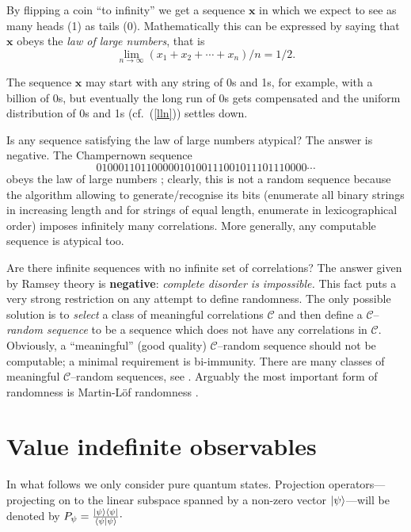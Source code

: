 \documentclass[%
 preprint,
 showpacs,
 showkeys,
 preprintnumbers,
  amsmath,amssymb,
  aps,
 pra,
  longbibliography,
  floatfix,
 ]{revtex4-1}
\theoremstyle{plain}
\newcommand{\x}{\mathbf{x}}
\newcommand{\ar}{\rightarrow}
\newcommand{\iprod}[2]{\langle #1 | #2 \rangle}
\newcommand{\oprod}[2]{| #1 \rangle\langle #2 |}
\begin{document}
\medskip


By flipping  a coin  ``to infinity'' we get a sequence $\x$ in which we expect to see as many heads (1) as tails (0). Mathematically this can be expressed by saying that
 $\x$ obeys the {\em law of large numbers}, that is
\begin{equation}
\label{lln}
\lim_{n\ar \infty}(x_{1}+ x_{2}+ \cdots +x_{n})/n=1/2.
\end{equation}

The sequence $\x$ may start with any string of 0s and 1s, for example, with a billion of 0s, but eventually the  long run of 0s gets compensated and the uniform distribution of 0s and 1s (cf.\ (\ref{lln})) settles down.

 Is any sequence satisfying the law of large numbers atypical? The answer is negative.
The Champernown sequence $$01000110110000010100111001011101110000\cdots$$ obeys the law of large numbers \cite{chm1933}; clearly, this is not a random sequence because the algorithm allowing to generate/recognise its bits (enumerate all binary strings in increasing length and for strings of equal length, enumerate in lexicographical order) imposes infinitely many correlations. More generally, any computable sequence is  atypical too.

\medskip

Are there infinite sequences with no infinite set of correlations? The answer given by Ramsey theory \cite{GS1990} is {\bf negative}: {\em complete disorder is  impossible.} This fact puts a very strong restriction on any attempt to define randomness. The only possible solution is to {\em select} a class of meaningful correlations $\mathcal{C}$  and then define a $\mathcal{C}$--{\em random sequence} to be a  sequence which does not have any correlations in $\mathcal{C}$. Obviously, a ``meaningful'' (good quality)  $\mathcal{C}$--random sequence should not be computable; a minimal requirement is bi-immunity.  There are many classes of meaningful $\mathcal{C}$--random sequences, see \cite{DH2010}. Arguably the most important form of randomness is Martin-L\"of randomness \cite{ML1966,Cris2002,DH2010}.

\section{Value indefinite observables}
 \label{sec:viobservables}

In what follows we only consider pure quantum states.
 Projection operators---projecting on to the linear subspace spanned by a non-zero vector $\ket{\psi}$---will be denoted by  $P_\psi = \frac{\oprod{\psi}{\psi}}{\iprod{\psi}{\psi}}\raisebox{.8mm}{.}$
\end{document}
